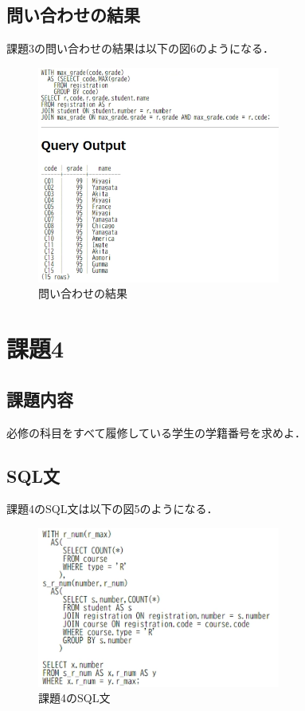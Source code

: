 \documentclass[dvipdfmx]{jarticle}
\begin{document}
\subsection{問い合わせの結果}
課題3の問い合わせの結果は以下の図6のようになる．
\begin{figure}[h]
    \centering
    \includegraphics[width = 8cm]{3.png}
    \caption{問い合わせの結果}
\end{figure}
\section{課題4}
\subsection{課題内容}
必修の科目をすべて履修している学生の学籍番号を求めよ．
\subsection{SQL文}
課題4のSQL文は以下の図5のようになる．
\begin{figure}[h]
    \centering
    \includegraphics[width = 8cm]{sql4.png}
    \caption{課題4のSQL文}
\end{figure}
\end{document}

